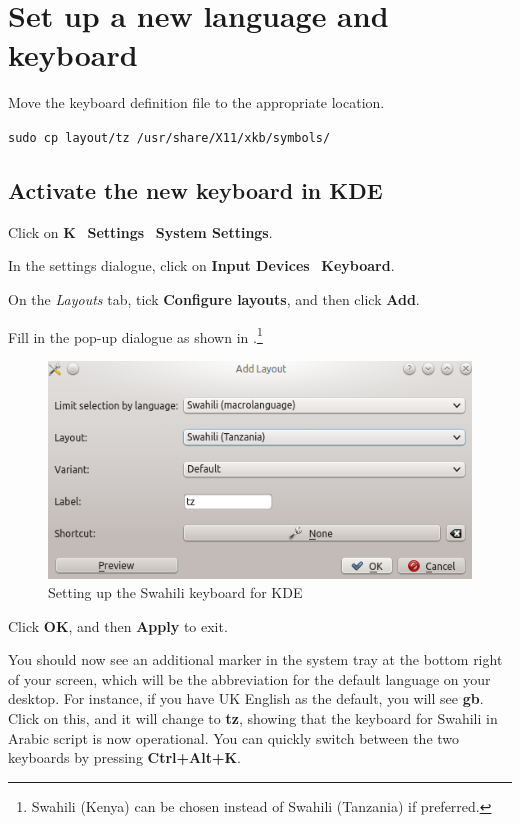 \section{Set up a new language and keyboard}
\label{s:keyboard}

Move the keyboard definition file to the appropriate location.

\verb|sudo cp layout/tz /usr/share/X11/xkb/symbols/|

\subsection{Activate the new keyboard in KDE}
\label{s:kbactivate}

Click on \textbf{K} \textrightarrow\ \textbf{Settings} \textrightarrow\ \textbf{System Settings}.

In the settings dialogue, click on \textbf{Input Devices} \textrightarrow\ \textbf{Keyboard}.

On the \textit{Layouts} tab, tick \textbf{Configure layouts}, and then click \textbf{Add}.

Fill in the pop-up dialogue as shown in .\footnote{Swahili (Kenya) can be chosen instead of Swahili (Tanzania) if preferred.}

\begin{figure}[h]
\centering
\includegraphics[keepaspectratio=true]{./images/kdelg.png}
\caption{Setting up the Swahili keyboard for KDE}
\label{fig:kdelg}
\end{figure}

Click \textbf{OK}, and then \textbf{Apply} to exit.

You should now see an additional marker in the system tray at the bottom right of your screen, which will be the abbreviation for the default language on your desktop.  For instance, if you have UK English as the default, you will see \textbf{gb}.  Click on this, and it will change to \textbf{tz}, showing that the keyboard for Swahili in Arabic script is now operational.  You can quickly switch between the two keyboards by pressing \textbf{Ctrl+Alt+K}.


